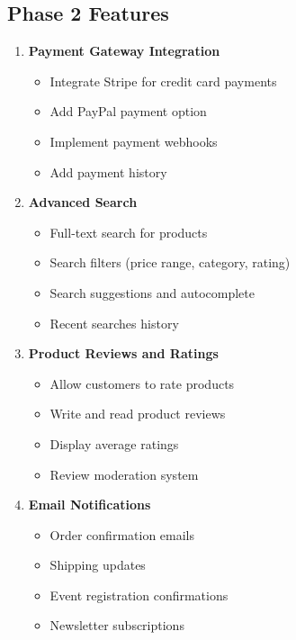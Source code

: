 \documentclass{scrreprt}
\begin{document}
\subsection{Phase 2 Features}
\begin{enumerate}
\item \textbf{Payment Gateway Integration}
\begin{itemize}
\item Integrate Stripe for credit card payments
\item Add PayPal payment option
\item Implement payment webhooks
\item Add payment history
\end{itemize}

\item \textbf{Advanced Search}
\begin{itemize}
\item Full-text search for products
\item Search filters (price range, category, rating)
\item Search suggestions and autocomplete
\item Recent searches history
\end{itemize}

\item \textbf{Product Reviews and Ratings}
\begin{itemize}
\item Allow customers to rate products
\item Write and read product reviews
\item Display average ratings
\item Review moderation system
\end{itemize}

\item \textbf{Email Notifications}
\begin{itemize}
\item Order confirmation emails
\item Shipping updates
\item Event registration confirmations
\item Newsletter subscriptions
\end{itemize}
\end{enumerate}
\end{document}
